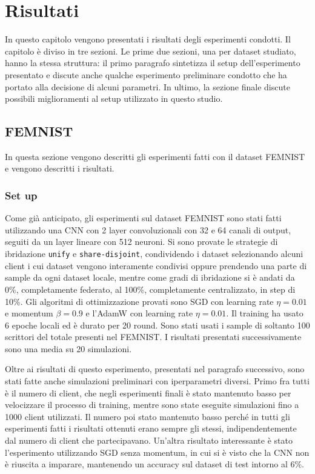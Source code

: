 \chapter{Risultati}
In questo capitolo vengono presentati i risultati degli esperimenti 
condotti. Il capitolo è diviso in tre sezioni.
Le prime due sezioni, una per dataset studiato, hanno la stessa 
struttura: il primo paragrafo sintetizza il 
setup dell'esperimento presentato e discute anche qualche esperimento
preliminare condotto che ha portato alla decisione di alcuni parametri.
In ultimo, la sezione finale discute possibili miglioramenti al setup
utilizzato in questo studio.


\section{FEMNIST}
In questa sezione vengono descritti gli esperimenti fatti con il dataset
FEMNIST e vengono descritti i risultati.

\subsection{Set up}
Come già anticipato, gli esperimenti sul dataset FEMNIST sono stati fatti 
utilizzando una CNN con 2 layer convoluzionali con 32 e 64 canali di 
output, seguiti da un layer lineare con 512 neuroni. Si sono provate le 
strategie di ibridazione \texttt{unify} e \texttt{share-disjoint},
condividendo i dataset selezionando alcuni client i cui dataset 
vengono interamente condivisi oppure prendendo una parte di sample da 
ogni dataset locale, mentre come gradi di ibridazione si è andati da 0\%,
completamente federato, al 100\%, completamente centralizzato,
in step di 10\%. Gli algoritmi di ottimizzazione provati sono SGD 
con learning rate \(\eta = 0.01\) e momentum \(\beta = 0.9\) e l'AdamW
con learning rate \(\eta = 0.01\). Il training ha usato 6 epoche locali
ed è durato per 20 round. Sono stati usati i sample di soltanto 100 
scrittori del totale presenti nel FEMNIST. I risultati presentati 
successivamente sono una media su 20 simulazioni.

Oltre ai risultati di questo esperimento, presentati nel paragrafo
successivo, sono stati fatte anche simulazioni preliminari con 
iperparametri diversi. Primo fra tutti è il numero di client, che negli 
esperimenti finali è stato mantenuto basso per velocizzare il processo 
di training, mentre sono state eseguite simulazioni fino a 1000 client 
utilizzati. Il numero poi stato mantenuto basso perché in tutti gli 
esperimenti fatti i risultati ottenuti erano sempre gli stessi, 
indipendentemente dal numero di client che partecipavano.
Un'altra risultato interessante è stato l'esperimento utilizzando SGD
senza momentum, in cui si è visto che la CNN non è riuscita a imparare,
mantenendo un accuracy sul dataset di test intorno al 6\%.

